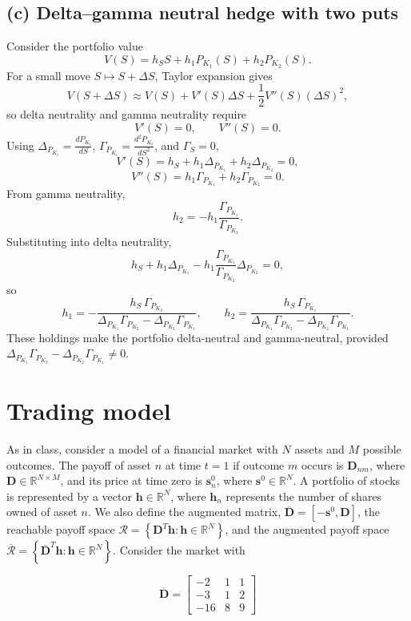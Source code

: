 \documentclass{article}
\begin{document}
\subsection*{(c) Delta--gamma neutral hedge with two puts}

Consider the portfolio value
\[
V(S)=h_S S + h_1 P_{K_1}(S)+h_2 P_{K_2}(S).
\]
For a small move \(S\mapsto S+\Delta S\), Taylor expansion gives
\[
V(S+\Delta S)
\approx
V(S)+V'(S)\Delta S+\frac12 V''(S)(\Delta S)^2,
\]
so delta neutrality and gamma neutrality require
\[
V'(S)=0,
\qquad
V''(S)=0.
\]
Using \(\Delta_{P_{K_i}}=\frac{dP_{K_i}}{dS}\),
\(\Gamma_{P_{K_i}}=\frac{d^2P_{K_i}}{dS^2}\), and \(\Gamma_S=0\),
\[
V'(S)=h_S + h_1 \Delta_{P_{K_1}} + h_2 \Delta_{P_{K_2}}=0,
\]
\[
V''(S)=h_1 \Gamma_{P_{K_1}} + h_2 \Gamma_{P_{K_2}}=0.
\]
From gamma neutrality,
\[
h_2=-h_1\frac{\Gamma_{P_{K_1}}}{\Gamma_{P_{K_2}}}.
\]
Substituting into delta neutrality,
\[
h_S + h_1 \Delta_{P_{K_1}}
- h_1\frac{\Gamma_{P_{K_1}}}{\Gamma_{P_{K_2}}}\Delta_{P_{K_2}}=0,
\]
so
\[
h_1
=
-\frac{h_S\,\Gamma_{P_{K_2}}}
{\Delta_{P_{K_1}}\Gamma_{P_{K_2}}-\Delta_{P_{K_2}}\Gamma_{P_{K_1}}},
\qquad
h_2
=
\frac{h_S\,\Gamma_{P_{K_1}}}
{\Delta_{P_{K_1}}\Gamma_{P_{K_2}}-\Delta_{P_{K_2}}\Gamma_{P_{K_1}}}.
\]
These holdings make the portfolio delta-neutral and gamma-neutral, provided
\(\Delta_{P_{K_1}}\Gamma_{P_{K_2}}-\Delta_{P_{K_2}}\Gamma_{P_{K_1}}\neq 0\).

\newpage
\section{Trading model}
As in class, consider a model of a financial market with $N$ assets and $M$ possible outcomes. The payoff of asset $n$ at time $t=1$ if outcome $m$ occurs is $\mathbf{D}_{n m}$, where $\mathbf{D} \in \mathbb{R}^{N \times M}$, and its price at time zero is $\mathbf{s}_{n}^{0}$, where $\mathbf{s}^{0} \in \mathbb{R}^{N}$. A portfolio of stocks is represented by a vector $\mathbf{h} \in \mathbb{R}^{N}$, where $\mathbf{h}_{n}$ represents the number of shares owned of asset $n$. We also define the augmented matrix, $\overline{\mathbf{D}}=\left[-\mathbf{s}^{0}, \mathbf{D}\right]$, the reachable payoff space $\mathcal{R}=\left\{\mathbf{D}^{T} \mathbf{h}: \mathbf{h} \in \mathbb{R}^{N}\right\}$, and the augmented payoff space $\overline{\mathcal{R}}=\left\{\overline{\mathbf{D}}^{T} \mathbf{h}: \mathbf{h} \in \mathbb{R}^{N}\right\}$. Consider the market with

\[
\overline{\mathbf{D}}=\left[\begin{array}{lll}
-2 & 1 & 1 \\
-3 & 1 & 2 \\
-16 & 8 & 9
\end{array}\right]
\]
\end{document}
